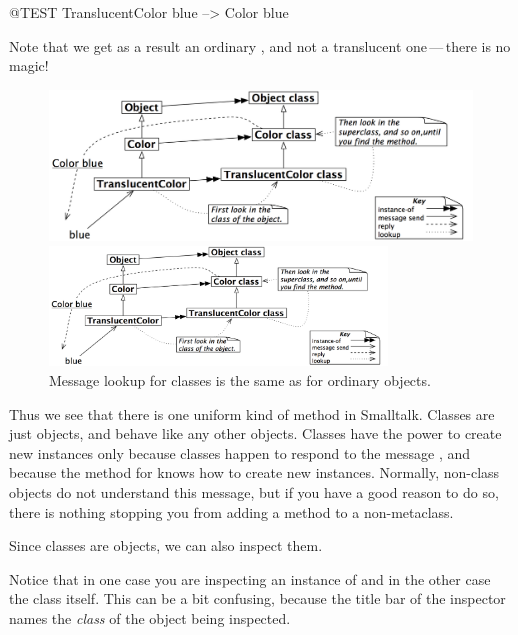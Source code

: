 \documentclass[a4paper,10pt,twoside]{book}
\begin{document}
\begin{code}{@TEST}
TranslucentColor blue --> Color blue
\end{code}
\noindent
Note that we get as a result an ordinary , and not a translucent one\,---\,there is no magic!

\begin{center}
\begin{figure}[!ht]
\ifluluelse
	{\centerline {\includegraphics[width=\textwidth]{TranslucentColorBlue}}}
	{\centerline {\includegraphics[width=0.8\textwidth]{TranslucentColorBlue}}}
\caption{Message lookup for classes is the same as for ordinary objects.\label{fig:metaclasslookup}}
\end{figure}
\end{center}

Thus we see that there is one uniform kind of method  in Smalltalk. Classes are just objects, and behave like any other objects. 
Classes have the power to create new instances only because classes happen to respond to the message , and because the method for  knows how to create new instances.
Normally, non-class objects do not understand this message, but if you have a good reason to do so, there is nothing stopping you from adding a  method to a non-metaclass.

Since classes are objects, we can also inspect them.


\noindent
Notice that in one case you are inspecting an instance of  and in the other case the  class itself.  
This can be a bit confusing, because the title bar of the inspector names the \emph{class} of the object being inspected.
\end{document}
